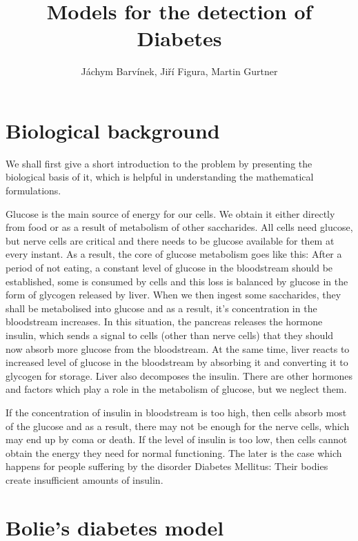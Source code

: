 \documentclass{article}
\begin{document}
\title{Models for the detection of Diabetes}
\author{J\'achym Barv\'inek, Ji\v r\'i Figura, Martin Gurtner}

\maketitle

\section{Biological background}
We shall first give a short introduction to the problem by presenting the biological basis of it,
which is helpful in understanding the mathematical formulations. 

Glucose is the main source of energy for our cells.
We obtain it either directly from food or as a result of metabolism of other saccharides. 
All cells need glucose, but nerve cells are critical and there needs to be glucose available for 
them at every instant. As a result, the core of glucose metabolism goes like this:
After a period of not eating, a constant level of glucose in the bloodstream should be established,
some is consumed by cells and this loss is balanced by glucose in the form of glycogen
released by liver. When we then ingest some saccharides, they shall be metabolised into glucose
and as a result, it's concentration in the bloodstream increases. In this situation, the pancreas
releases the hormone insulin, which sends a signal to cells (other than nerve cells) that they should
now absorb more glucose from the bloodstream. At the same time, liver reacts to increased level of 
glucose in the bloodstream by absorbing it and converting it to glycogen for storage. Liver also 
decomposes the insulin. There are other hormones and factors which play a role in the metabolism
of glucose, but we neglect them.

If the concentration of insulin in bloodstream is too high, then cells absorb most of the glucose 
and as a result, there may not be enough for the nerve cells, which may end up by coma or death.
If the level of insulin is too low, then cells cannot obtain the energy they need for normal functioning.
The later is the case which happens for people suffering by the disorder Diabetes Mellitus: Their bodies
create insufficient amounts of insulin.


\section{Bolie's diabetes model}
\end{document}
